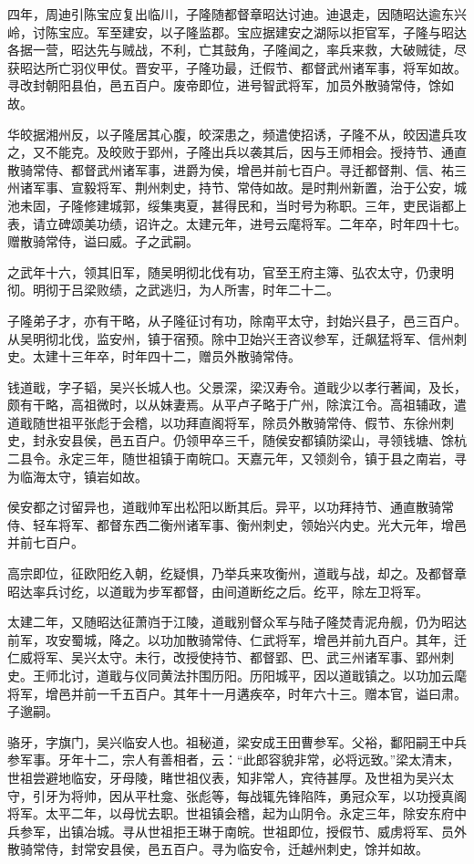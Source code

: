 \documentclass[]{article}
\begin{document}
四年，周迪引陈宝应复出临川，子隆随都督章昭达讨迪。迪退走，因随昭达逾东兴岭，讨陈宝应。军至建安，以子隆监郡。宝应据建安之湖际以拒官军，子隆与昭达各据一营，昭达先与贼战，不利，亡其鼓角，子隆闻之，率兵来救，大破贼徒，尽获昭达所亡羽仪甲仗。晋安平，子隆功最，迁假节、都督武州诸军事，将军如故。寻改封朝阳县伯，邑五百户。废帝即位，进号智武将军，加员外散骑常侍，馀如故。

华皎据湘州反，以子隆居其心腹，皎深患之，频遣使招诱，子隆不从，皎因遣兵攻之，又不能克。及皎败于郢州，子隆出兵以袭其后，因与王师相会。授持节、通直散骑常侍、都督武州诸军事，进爵为侯，增邑并前七百户。寻迁都督荆、信、祐三州诸军事、宣毅将军、荆州刺史，持节、常侍如故。是时荆州新置，治于公安，城池未固，子隆修建城郭，绥集夷夏，甚得民和，当时号为称职。三年，吏民诣都上表，请立碑颂美功绩，诏许之。太建元年，进号云麾将军。二年卒，时年四十七。赠散骑常侍，谥曰威。子之武嗣。

之武年十六，领其旧军，随吴明彻北伐有功，官至王府主簿、弘农太守，仍隶明彻。明彻于吕梁败绩，之武逃归，为人所害，时年二十二。

子隆弟子才，亦有干略，从子隆征讨有功，除南平太守，封始兴县子，邑三百户。从吴明彻北伐，监安州，镇于宿预。除中卫始兴王咨议参军，迁飙猛将军、信州刺史。太建十三年卒，时年四十二，赠员外散骑常侍。

钱道戢，字子韬，吴兴长城人也。父景深，梁汉寿令。道戢少以孝行著闻，及长，颇有干略，高祖微时，以从妹妻焉。从平卢子略于广州，除滨江令。高祖辅政，遣道戢随世祖平张彪于会稽，以功拜直阁将军，除员外散骑常侍、假节、东徐州刺史，封永安县侯，邑五百户。仍领甲卒三千，随侯安都镇防梁山，寻领钱塘、馀杭二县令。永定三年，随世祖镇于南皖口。天嘉元年，又领剡令，镇于县之南岩，寻为临海太守，镇岩如故。

侯安都之讨留异也，道戢帅军出松阳以断其后。异平，以功拜持节、通直散骑常侍、轻车将军、都督东西二衡州诸军事、衡州刺史，领始兴内史。光大元年，增邑并前七百户。

高宗即位，征欧阳纥入朝，纥疑惧，乃举兵来攻衡州，道戢与战，却之。及都督章昭达率兵讨纥，以道戢为步军都督，由间道断纥之后。纥平，除左卫将军。

太建二年，又随昭达征萧岿于江陵，道戢别督众军与陆子隆焚青泥舟舰，仍为昭达前军，攻安蜀城，降之。以功加散骑常侍、仁武将军，增邑并前九百户。其年，迁仁威将军、吴兴太守。未行，改授使持节、都督郢、巴、武三州诸军事、郢州刺史。王师北讨，道戢与仪同黄法抃围历阳。历阳城平，因以道戢镇之。以功加云麾将军，增邑并前一千五百户。其年十一月遘疾卒，时年六十三。赠本官，谥曰肃。子邈嗣。

骆牙，字旗门，吴兴临安人也。祖秘道，梁安成王田曹参军。父裕，鄱阳嗣王中兵参军事。牙年十二，宗人有善相者，云：``此郎容貌非常，必将远致。''梁太清末，世祖尝避地临安，牙母陵，睹世祖仪表，知非常人，宾待甚厚。及世祖为吴兴太守，引牙为将帅，因从平杜龛、张彪等，每战辄先锋陷阵，勇冠众军，以功授真阁将军。太平二年，以母忧去职。世祖镇会稽，起为山阴令。永定三年，除安东府中兵参军，出镇冶城。寻从世祖拒王琳于南皖。世祖即位，授假节、威虏将军、员外散骑常侍，封常安县侯，邑五百户。寻为临安令，迁越州刺史，馀并如故。
\end{document}
